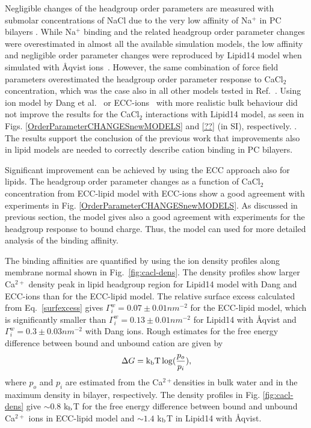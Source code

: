 \documentclass[aip,jcp,twocolumn]{revtex4}
\begin{document}

Negligible changes of the headgroup order parameters are measured
with submolar concentrations of NaCl due to the very low affinity of Na$^+$
in PC bilayers \cite{akutsu81}. While Na$^+$ binding and the related 
headgroup order parameter changes were overestimated in
almost all the available simulation models, the low affinity
and negligible order parameter changes were reproduced by Lipid14 
model when simulated with \AA{}qvist ions~\cite{catte16}.
However, the same combination of force field parameters
overestimated the headgroup order parameter response to CaCl$_2$ 
concentration, which was the case also in all other models tested in
Ref.~.
Using ion model by Dang et al.~\cite{smith94,chang1999,dang2006} or
ECC-ions~\cite{jungwirth17-new-paper-to-be-published, kohagen16, Pluharova2014}
with more realistic bulk behaviour did not improve the results
for the CaCl$_2$ interactions with Lipid14 model, as seen 
in Figs. \ref{OrderParameterCHANGESnewMODELS} and \ref{??} (in SI), respectively.
.
The results support the conclusion of the previous work \cite{catte16}
that improvements also in lipid models are needed to 
correctly describe cation binding in PC bilayers.

Significant improvement can be achieved by using the ECC
approach also for lipids. The headgroup order parameter changes
as a function of CaCl$_2$ concentration from ECC-lipid model with ECC-ions
show a good agreement with experiments in Fig. \ref{OrderParameterCHANGESnewMODELS}.
As discussed in previous section, the model gives also
a good agreement with experiments for
the headgroup response to bound charge.
Thus, the model can used for more detailed analysis of the
binding affinity.


The binding affinities are quantified by using
the ion density profiles along membrane normal shown
in Fig.~\ref{fig:cacl-dens}. The density profiles show
larger Ca$^{2+}$ density peak in lipid headgroup region for
Lipid14 model with Dang and ECC-ions than for the ECC-lipid model.
The relative surface excess calculated from Eq.~\ref{surfexcess} gives 
$\Gamma_i^w = 0.07 \pm 0.01 nm^{-2}$ for the ECC-lipid model,
which is significantly smaller than $\Gamma_i^w = 0.13 \pm 0.01 nm^{-2}$ for
Lipid14 with \AA{}qvist and $\Gamma_i^w = 0.3 \pm 0.03 nm^{-2}$ with Dang ions.
Rough estimates for the free energy difference between bound and unbound cation
are given by
\begin{equation}
  \Delta G={\rm k_b T}\log(\frac{p_o}{p_i}),
\end{equation}
where $p_o$ and $p_i$ are estimated from the Ca$^{2+}$densities in bulk water and
in the maximum density in bilayer, respectively. The density profiles in
Fig. \ref{fig:cacl-dens} give $\sim 0.8$ k$_{\rm b}$T for the free energy difference
between bound and unbound Ca$^{2+}$ ions in ECC-lipid model and $\sim 1.4$ k$_{\rm b}$T
in Lipid14 with \AA{}qvist.
\end{document}
